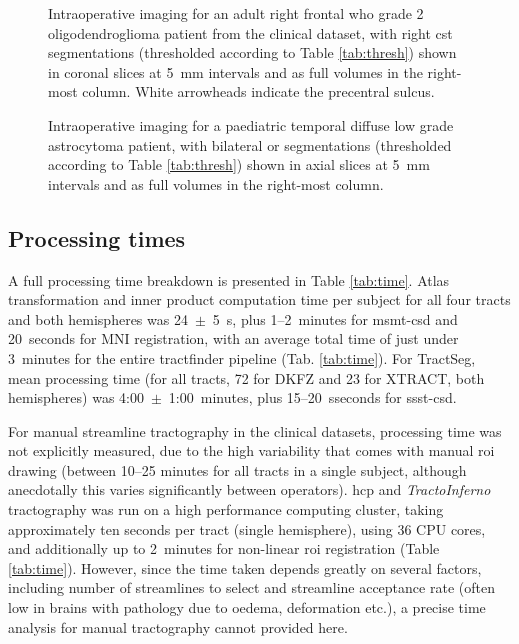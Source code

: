 \begin{figure}[htb!]
  \makebox[\linewidth][r]{%
  }
  \caption{Intraoperative imaging for an adult right frontal \gls{who} grade 2 oligodendroglioma patient from the clinical dataset, with right \gls{cst} segmentations (thresholded according to Table \ref{tab:thresh}) shown in coronal slices at 5~mm intervals and as full volumes in the right-most column. White arrowheads indicate the precentral sulcus.}
  \label{fig:lb.nh}
\end{figure}
\begin{figure}[htb!]
  \makebox[\linewidth][r]{%
  }
  \caption{Intraoperative imaging for a paediatric temporal diffuse low grade astrocytoma patient, with bilateral \gls{or} segmentations (thresholded according to Table \ref{tab:thresh}) shown in axial slices at 5~mm intervals and as full volumes in the right-most column.}
  \label{fig:lb.gosh}
\end{figure}


\subsection{Processing times}

A full processing time breakdown is presented in Table \ref{tab:time}.
Atlas transformation and inner product computation time per subject for all four tracts and both hemispheres was 24~$\pm$~5~s, plus 1--2~minutes for \gls{msmt}-\gls{csd} and 20~seconds for MNI registration, with an average total time of just under 3~minutes for the entire tractfinder pipeline (Tab. \ref{tab:time}).
For TractSeg, mean processing time (for all tracts, 72 for DKFZ and 23 for XTRACT, both hemispheres) was 4:00~$\pm$~1:00~minutes, plus 15--20~sseconds for \gls{ssst}-\gls{csd}.

For manual streamline tractography in the clinical datasets, processing time was not explicitly measured, due to the high variability that comes with manual \gls{roi} drawing (between 10--25 minutes for all tracts in a single subject, although anecdotally this varies significantly between operators).
\Gls{hcp} and \textit{TractoInferno} tractography was run on a high performance computing cluster, taking approximately ten seconds per tract (single hemisphere), using 36 CPU cores, and additionally up to 2~minutes for non-linear \gls{roi} registration (Table \ref{tab:time}).
However, since the time taken depends greatly on several factors, including number of streamlines to select and streamline acceptance rate (often low in brains with pathology due to oedema, deformation etc.), a precise time analysis for manual tractography cannot provided here.

